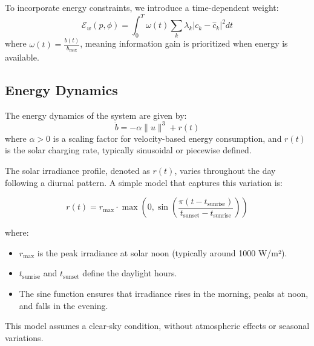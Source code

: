 To incorporate energy constraints, we introduce a time-dependent weight:
\begin{equation}
\mathcal{E}_w(p, \phi) = \int_0^T \omega(t) \sum_k \lambda_k \left| c_k - \hat{c}_k \right|^2 dt
\end{equation}
where $\omega(t) = \frac{b(t)}{b_{\max}}$, meaning information gain is prioritized when energy is available.

\subsection{Energy Dynamics}
The energy dynamics of the system are given by:
\begin{equation}
    \dot{b} = - \alpha \|u\|^3 + r(t)
\end{equation}
where $\alpha > 0$ is a scaling factor for velocity-based energy consumption, and $r(t)$ is the solar charging rate, typically sinusoidal or piecewise defined.

The solar irradiance profile, denoted as \( r(t) \), varies throughout the day following a diurnal pattern. A simple model that captures this variation is:

\begin{equation}
    r(t) = r_{\max} \cdot \max\left(0, \sin\left(\frac{\pi (t - t_{\text{sunrise}})}{t_{\text{sunset}} - t_{\text{sunrise}}} \right) \right)
\end{equation}

where:
\begin{itemize}
    \item \( r_{\max} \) is the peak irradiance at solar noon (typically around 1000 W/m²).
    \item \( t_{\text{sunrise}} \) and \( t_{\text{sunset}} \) define the daylight hours.
    \item The sine function ensures that irradiance rises in the morning, peaks at noon, and falls in the evening.
\end{itemize}

This model assumes a clear-sky condition, without atmospheric effects or seasonal variations.
